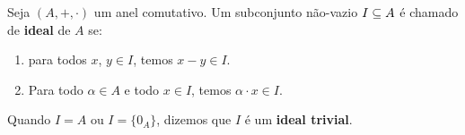 \begin{definicao}
	Seja $(A, +, \cdot)$ um anel comutativo. Um subconjunto n\~ao-vazio $I \subseteq A$ {\'e} chamado de \textbf{ideal} de $A$ se:
	\begin{enumerate}[label={\roman*})]
		\item para todos $x$, $y \in I$, temos $x - y \in I$.
		\item Para todo $\alpha \in A$ e todo $x \in I$, temos $\alpha\cdot x \in I$.
	\end{enumerate}
\end{definicao}

\begin{observacao}
	Quando $I = A$ ou $I = \{0_A\}$, dizemos que $I$ {\'e} um \textbf{ideal trivial}.
\end{observacao}

